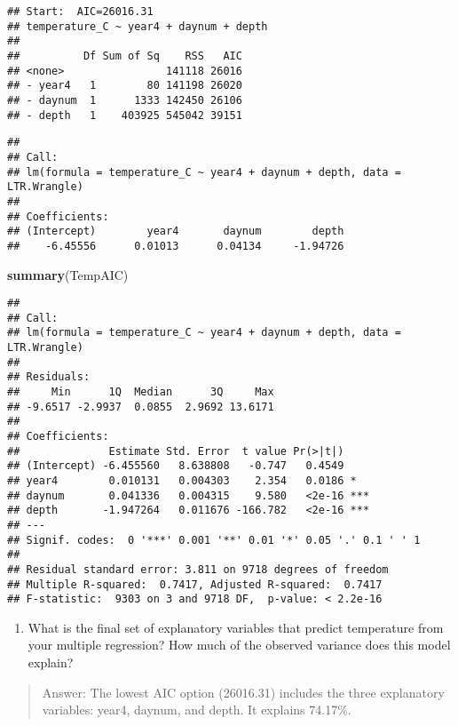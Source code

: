 \documentclass[]{article}
\newenvironment{Shaded}{\begin{snugshade}}{\end{snugshade}}
\newcommand{\KeywordTok}[1]{\textcolor[rgb]{0.13,0.29,0.53}{\textbf{#1}}}
\newcommand{\NormalTok}[1]{#1}
\providecommand{\tightlist}{%
  \setlength{\itemsep}{0pt}\setlength{\parskip}{0pt}}
\begin{document}
\begin{verbatim}
## Start:  AIC=26016.31
## temperature_C ~ year4 + daynum + depth
## 
##          Df Sum of Sq    RSS   AIC
## <none>                141118 26016
## - year4   1        80 141198 26020
## - daynum  1      1333 142450 26106
## - depth   1    403925 545042 39151
\end{verbatim}

\begin{verbatim}
## 
## Call:
## lm(formula = temperature_C ~ year4 + daynum + depth, data = LTR.Wrangle)
## 
## Coefficients:
## (Intercept)        year4       daynum        depth  
##    -6.45556      0.01013      0.04134     -1.94726
\end{verbatim}

\begin{Shaded}
\begin{Highlighting}[]
\KeywordTok{summary}\NormalTok{(TempAIC)}
\end{Highlighting}
\end{Shaded}

\begin{verbatim}
## 
## Call:
## lm(formula = temperature_C ~ year4 + daynum + depth, data = LTR.Wrangle)
## 
## Residuals:
##     Min      1Q  Median      3Q     Max 
## -9.6517 -2.9937  0.0855  2.9692 13.6171 
## 
## Coefficients:
##              Estimate Std. Error  t value Pr(>|t|)    
## (Intercept) -6.455560   8.638808   -0.747   0.4549    
## year4        0.010131   0.004303    2.354   0.0186 *  
## daynum       0.041336   0.004315    9.580   <2e-16 ***
## depth       -1.947264   0.011676 -166.782   <2e-16 ***
## ---
## Signif. codes:  0 '***' 0.001 '**' 0.01 '*' 0.05 '.' 0.1 ' ' 1
## 
## Residual standard error: 3.811 on 9718 degrees of freedom
## Multiple R-squared:  0.7417, Adjusted R-squared:  0.7417 
## F-statistic:  9303 on 3 and 9718 DF,  p-value: < 2.2e-16
\end{verbatim}

\begin{enumerate}
\def\labelenumi{\arabic{enumi}.}
\setcounter{enumi}{4}
\tightlist
\item
  What is the final set of explanatory variables that predict
  temperature from your multiple regression? How much of the observed
  variance does this model explain?
\end{enumerate}

\begin{quote}
Answer: The lowest AIC option (26016.31) includes the three explanatory
variables: year4, daynum, and depth. It explains 74.17\%.
\end{quote}
\end{document}
